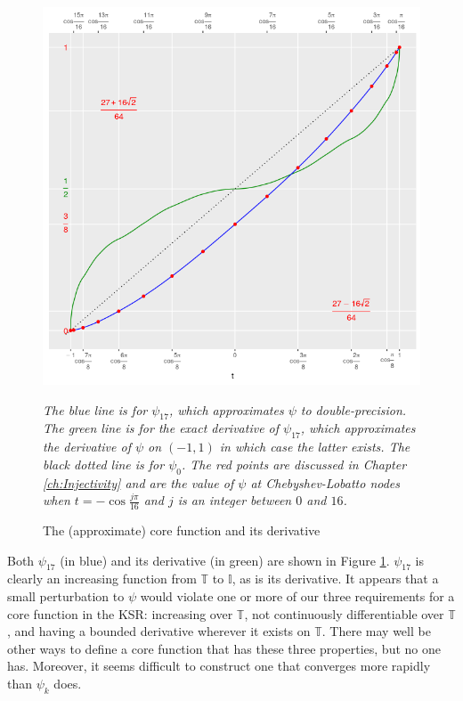 \begin{figure}
    \begin{center}
    \caption{The (approximate) core function and its derivative}
    \label{fig:core}
    \includegraphics[width=0.95\linewidth]{core.png}
    \end{center}
    \emph{The blue line is for $\psi_{17}$, which approximates $\psi$ to double-precision. The green line is for the exact derivative of $\psi_{17}$, which approximates the derivative of $\psi$ on $\left(-1,1\right)$ in which case the latter exists. The black dotted line is for $\psi_0$. The red points are discussed in Chapter \ref{ch:Injectivity} and are the value of $\psi$ at Chebyshev-Lobatto nodes when $t = -\cos\frac{j\pi}{16}$ and $j$ is an integer between $0$ and $16$.}
\end{figure}

Both $\psi_{17}$ (in blue) and its derivative (in green) are shown in Figure \ref{fig:core}. $\psi_{17}$ is clearly an increasing function from $\mathbb{T}$ to $\mathbb{I}$, as is its derivative. It appears that a small perturbation to $\psi$ would violate one or more of our three requirements for a core function in the KSR: increasing over $\mathbb{T}$, not continuously differentiable over $\mathbb{T}$, and having a bounded derivative wherever it exists on $\mathbb{T}$. There may well be other ways to define a core function that has these three properties, but no one has. Moreover, it seems difficult to construct one that converges more rapidly than $\psi_k$ does. 

